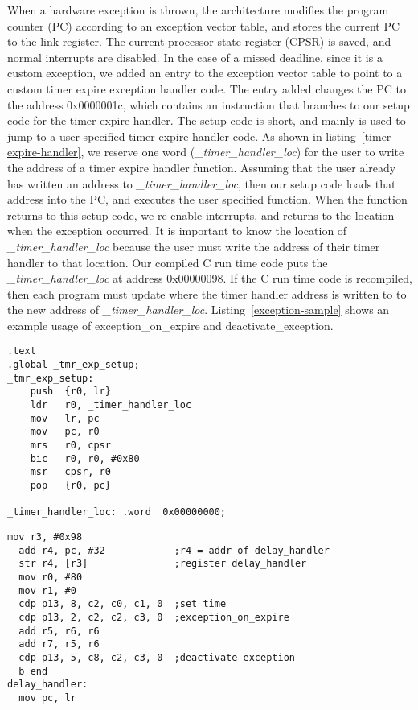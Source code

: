When a hardware exception is thrown, the architecture modifies the program counter (PC) according to an exception vector table, and stores the current PC to the link register. 
The current processor state register (CPSR) is saved, and normal interrupts are disabled. 
In the case of a missed deadline, since it is a custom exception, we added an entry to the exception vector table to point to a custom timer expire exception handler code. 
The entry added changes the PC to the address 0x0000001c, which contains an instruction that branches to our setup code for the timer expire handler. 
The setup code is short, and mainly is used to jump to a user specified timer expire handler code.
As shown in listing~\ref{timer-expire-handler}, we reserve one word (\textit{\_timer\_handler\_loc}) for the user to write the address of a timer expire handler function. 
Assuming that the user already has written an address to \textit{\_timer\_handler\_loc}, then our setup code loads that address into the PC, and executes the user specified function. 
When the function returns to this setup code, we re-enable interrupts, and returns to the location when the exception occurred.
It is important to know the location of \textit{\_timer\_handler\_loc} because the user must write the address of their timer handler to that location.
Our compiled C run time code puts the \textit{\_timer\_handler\_loc} at address 0x00000098.
If the C run time code is recompiled, then each program must update where the timer handler address is written to to the new address of \textit{\_timer\_handler\_loc}.
Listing~\ref{exception-sample} shows an example usage of exception\_on\_expire and deactivate\_exception.    
\begin{lstlisting}[label=timer-expire-handler,caption=The custom timer expire setup code]
.text
.global _tmr_exp_setup;
_tmr_exp_setup:
    push  {r0, lr}
    ldr   r0, _timer_handler_loc 
    mov   lr, pc
    mov   pc, r0
    mrs   r0, cpsr
    bic   r0, r0, #0x80
    msr   cpsr, r0
    pop   {r0, pc}

_timer_handler_loc: .word  0x00000000;
\end{lstlisting}

\begin{lstlisting}[label=exception-sample,caption=Sample assembly code of exception\_on\_expire and deactivate\_exception ]
  mov r3, #0x98
  add r4, pc, #32            ;r4 = addr of delay_handler
  str r4, [r3]               ;register delay_handler
  mov r0, #80
  mov r1, #0
  cdp p13, 8, c2, c0, c1, 0  ;set_time
  cdp p13, 2, c2, c2, c3, 0  ;exception_on_expire
  add r5, r6, r6
  add r7, r5, r6
  cdp p13, 5, c8, c2, c3, 0  ;deactivate_exception
  b end
delay_handler:
  mov pc, lr
\end{lstlisting}


